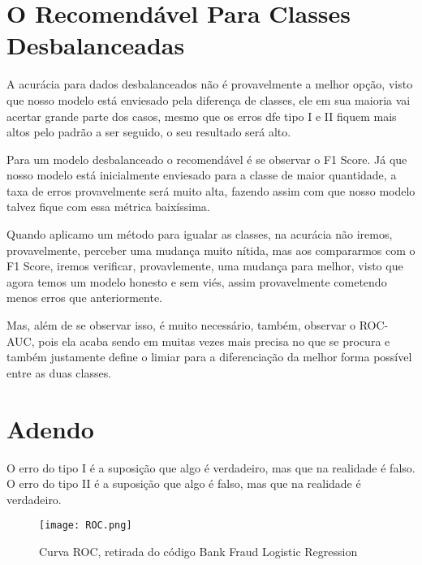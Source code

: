 \documentclass{article}
\begin{document}
\section{O Recomendável Para Classes Desbalanceadas}


A acurácia para dados desbalanceados não é provavelmente a melhor opção, visto que nosso modelo está enviesado pela diferença de classes, ele em sua maioria vai acertar grande parte dos casos, mesmo que os erros dfe tipo I e II fiquem mais altos pelo padrão a ser seguido, o seu resultado será alto.

Para um modelo desbalanceado o recomendável é se observar o F1 Score. Já que nosso modelo está inicialmente enviesado para a classe de maior quantidade, a taxa de erros provavelmente será muito alta, fazendo assim com que nosso modelo talvez fique com essa métrica baixíssima.

Quando aplicamo um método para igualar as classes, na acurácia não iremos, provavelmente, perceber uma mudança muito nítida, mas aos compararmos com o F1 Score, iremos verificar, provavlemente, uma mudança para melhor, visto que agora temos um modelo honesto e sem viés, assim provavelmente cometendo menos erros que anteriormente.

Mas, além de se observar isso, é muito necessário, também, observar o ROC-AUC, pois ela acaba sendo em muitas vezes mais precisa no que se procura e também justamente define o limiar para a diferenciação da melhor forma possível entre as duas classes.


\section{Adendo}
O erro do tipo I é a suposição que algo é verdadeiro, mas que na realidade é falso.
O erro do tipo II é a suposição que algo é falso, mas que na realidade é verdadeiro.

\begin{figure}[!h]
    \centering
    \texttt{[image: ROC.png]}
    \caption{\label{fig:frog}Curva ROC, retirada do código Bank Fraud Logistic Regression}
\end{figure}
\end{document}
